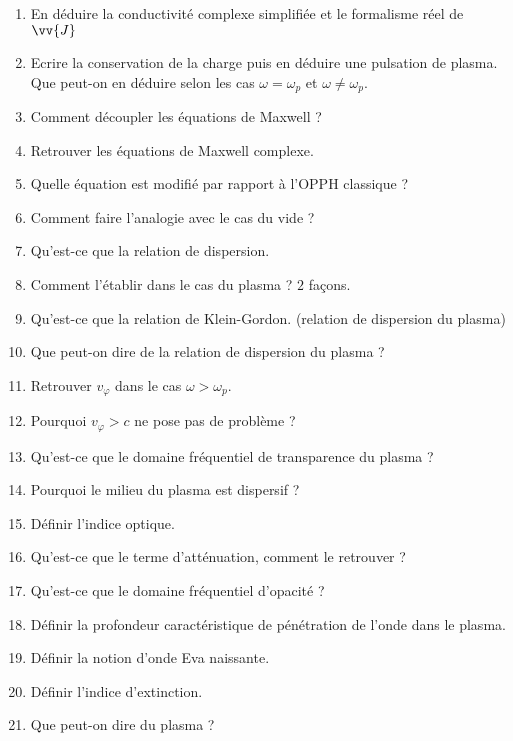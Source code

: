 \documentclass[a4paper, 11pt, hidelinks]{article}
\begin{document}
\begin{enumerate}
    \item En déduire la conductivité complexe simplifiée et le formalisme réel de $\vv{J}$ \cite{Chapitre16}
    \item Ecrire la conservation de la charge puis en déduire une pulsation de plasma. Que peut-on en déduire selon les cas $\omega=\omega_p$ et $\omega\neq \omega_p$. \cite{Chapitre16}
    \item Comment découpler les équations de Maxwell ? \cite{Chapitre16}
    \item Retrouver les équations de Maxwell complexe. \cite{Chapitre16}
    \item Quelle équation est modifié par rapport à l'OPPH classique ? \cite{Chapitre16}
    \item Comment faire l'analogie avec le cas du vide ? \cite{Chapitre16}
    \item Qu'est-ce que la relation de dispersion. \cite{Chapitre16}
    \item Comment l'établir dans le cas du plasma ? $2$ façons. \cite{Chapitre16}
    \item Qu'est-ce que la relation de Klein-Gordon. (relation de dispersion du plasma) \cite{Chapitre16}
    \item Que peut-on dire de la relation de dispersion du plasma ? \cite{Chapitre16}
    \item Retrouver $v_{\varphi}$ dans le cas $\omega > \omega_p$. \cite{Chapitre16}
    \item Pourquoi $v_{\varphi}>c$ ne pose pas de problème ? \cite{Chapitre16}
    \item Qu'est-ce que le domaine fréquentiel de transparence du plasma ? \cite{Chapitre16}
    \item Pourquoi le milieu du plasma est dispersif ? \cite{Chapitre16}
    \item Définir l'indice optique. \cite{Chapitre16}
    \item Qu'est-ce que le terme d'atténuation, comment le retrouver ? \cite{Chapitre16}
    \item Qu'est-ce que le domaine fréquentiel d'opacité ? \cite{Chapitre16}
    \item Définir la profondeur caractéristique de pénétration de l'onde dans le plasma. \cite{Chapitre16}
    \item Définir la notion d'onde Eva naissante. \cite{Chapitre16}
    \item Définir l'indice d'extinction. \cite{Chapitre16}
    \item Que peut-on dire du plasma ? \cite{Chapitre16}

\end{enumerate}
\end{document}
